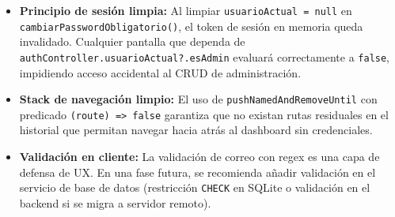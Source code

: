 \documentclass[12pt,a4paper]{article}
\begin{document}
\begin{itemize}[leftmargin=2em]
  \item \textbf{Principio de sesión limpia:} Al limpiar \texttt{usuarioActual = null} en
        \texttt{cambiarPasswordObligatorio()}, el token de sesión en memoria queda invalidado.
        Cualquier pantalla que dependa de \texttt{authController.usuarioActual?.esAdmin}
        evaluará correctamente a \texttt{false}, impidiendo acceso accidental al CRUD
        de administración.

  \item \textbf{Stack de navegación limpio:} El uso de \texttt{pushNamedAndRemoveUntil} con
        predicado \texttt{(route) => false} garantiza que no existan rutas residuales en el
        historial que permitan navegar hacia atrás al dashboard sin credenciales.

  \item \textbf{Validación en cliente:} La validación de correo con regex es una capa de
        defensa de UX. En una fase futura, se recomienda añadir validación en el servicio
        de base de datos (restricción \texttt{CHECK} en SQLite o validación en el backend
        si se migra a servidor remoto).
\end{itemize}
\end{document}
